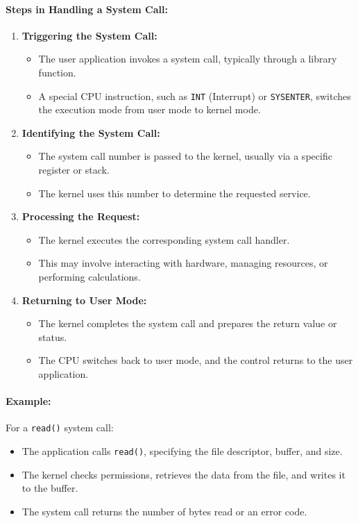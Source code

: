 \paragraph{Steps in Handling a System Call:}
\begin{enumerate}
    \item \textbf{Triggering the System Call:}
    \begin{itemize}
        \item The user application invokes a system call, typically through a library function.
        \item A special CPU instruction, such as \texttt{INT} (Interrupt) or \texttt{SYSENTER}, switches the execution mode from user mode to kernel mode.
    \end{itemize}
    
    \item \textbf{Identifying the System Call:}
    \begin{itemize}
        \item The system call number is passed to the kernel, usually via a specific register or stack.
        \item The kernel uses this number to determine the requested service.
    \end{itemize}
    
    \item \textbf{Processing the Request:}
    \begin{itemize}
        \item The kernel executes the corresponding system call handler.
        \item This may involve interacting with hardware, managing resources, or performing calculations.
    \end{itemize}
    
    \item \textbf{Returning to User Mode:}
    \begin{itemize}
        \item The kernel completes the system call and prepares the return value or status.
        \item The CPU switches back to user mode, and the control returns to the user application.
    \end{itemize}
\end{enumerate}

\paragraph{Example:}
For a \texttt{read()} system call:
\begin{itemize}
    \item The application calls \texttt{read()}, specifying the file descriptor, buffer, and size.
    \item The kernel checks permissions, retrieves the data from the file, and writes it to the buffer.
    \item The system call returns the number of bytes read or an error code.
\end{itemize}


